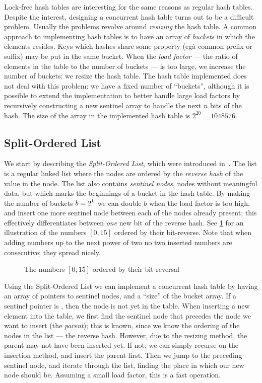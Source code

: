 Lock-free hash tables are interesting for the same reasons as regular hash tables. Despite the
interest, designing a concurrent hash table turns out to be a difficult problem.
Usually the problems revolve around \emph{resizing} the hash table. A common approach to
implementing hash tables is to have an array of \emph{buckets} in which the elements resides. Keys
which hashes share some property (eg\. a common prefix or suffix) may be put in the same bucket.
When the \emph{load factor} --- the ratio of elements in the table to the number of buckets --- is
too large, we increase the number of buckets: we resize the hash table. The hash table implemented
does not deal with this problem: we have a fixed number of ``buckets'', although it is possible to
extend the implementation to better handle large load factors by recursively constructing a new
sentinel array to handle the next $n$ bits of the hash.
The size of the array in the implemented hash table is $2^{20} = 1048576$.


\subsection{Split-Ordered List}

We start by describing the \emph{Split-Ordered List}, which were introduced
in~\cite{shalev2006split}.  The list is a regular linked list where the nodes are ordered by the
\emph{reverse hash} of the value in the node. The list also contains \emph{sentinel nodes}, nodes
without meaningful data, but which marks the beginnings of a bucket in the hash table.  By making
the number of buckets $b=2\sp{k}$ we can double $b$ when the load factor is too high, and insert
one more sentinel node between each of the nodes already present; this effectively differentiates
between \emph{one} new bit of the reverse hash.  See \cref{fig:reverse-bits} for an illustration of
the numbers $[0,15]$ ordered by their bit-reverse. Note that when adding numbers up to the next
power of two no two inserted numbers are consecutive; they spread nicely.

\begin{figure}[ht]
  \centering
  
  \caption{The numbers $[0, 15]$ ordered by their bit-reversal\label{fig:reverse-bits}}
\end{figure}

Using the Split-Ordered List we can implement a concurrent hash table by having an array of
pointers to sentinel nodes, and a ``size'' of the bucket array. If a sentinel pointer is
, then the node is not yet in the table. When inserting a new element into the table, we
first find the sentinel node that precedes the node we want to insert (the \emph{parent}); this is
known, since we know the ordering of the nodes in the list --- the reverse hash. However, due to
the resizing method, the parent may not have been inserted yet. If not, we can simply recurse on
the insertion method, and insert the parent first. Then we jump to the preceding sentinel node, and
iterate through the list, finding the place in which our new node should be. Assuming a small load
factor, this is a fast operation.

